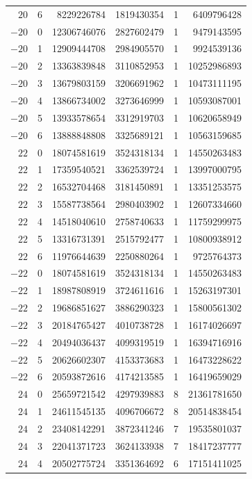 {\begin{longtable}{rrrrrr}
$20$ & 6 & 8229226784 & 1819430354 & 1 & 6409796428\\
$-20$ & 0 & 12306746076 & 2827602479 & 1 & 9479143595\\
$-20$ & 1 & 12909444708 & 2984905570 & 1 & 9924539136\\
$-20$ & 2 & 13363839848 & 3110852953 & 1 & 10252986893\\
$-20$ & 3 & 13679803159 & 3206691962 & 1 & 10473111195\\
$-20$ & 4 & 13866734002 & 3273646999 & 1 & 10593087001\\
$-20$ & 5 & 13933578654 & 3312919703 & 1 & 10620658949\\
$-20$ & 6 & 13888848808 & 3325689121 & 1 & 10563159685\\
$22$ & 0 & 18074581619 & 3524318134 & 1 & 14550263483\\
$22$ & 1 & 17359540521 & 3362539724 & 1 & 13997000795\\
$22$ & 2 & 16532704468 & 3181450891 & 1 & 13351253575\\
$22$ & 3 & 15587738564 & 2980403902 & 1 & 12607334660\\
$22$ & 4 & 14518040610 & 2758740633 & 1 & 11759299975\\
$22$ & 5 & 13316731391 & 2515792477 & 1 & 10800938912\\
$22$ & 6 & 11976644639 & 2250880264 & 1 & 9725764373\\
$-22$ & 0 & 18074581619 & 3524318134 & 1 & 14550263483\\
$-22$ & 1 & 18987808919 & 3724611616 & 1 & 15263197301\\
$-22$ & 2 & 19686851627 & 3886290323 & 1 & 15800561302\\
$-22$ & 3 & 20184765427 & 4010738728 & 1 & 16174026697\\
$-22$ & 4 & 20494036437 & 4099319519 & 1 & 16394716916\\
$-22$ & 5 & 20626602307 & 4153373683 & 1 & 16473228622\\
$-22$ & 6 & 20593872616 & 4174213585 & 1 & 16419659029\\
$24$ & 0 & 25659721542 & 4297939883 & 8 & 21361781650\\
$24$ & 1 & 24611545135 & 4096706672 & 8 & 20514838454\\
$24$ & 2 & 23408142291 & 3872341246 & 7 & 19535801037\\
$24$ & 3 & 22041371723 & 3624133938 & 7 & 18417237777\\
$24$ & 4 & 20502775724 & 3351364692 & 6 & 17151411025\\

\end{longtable}}
